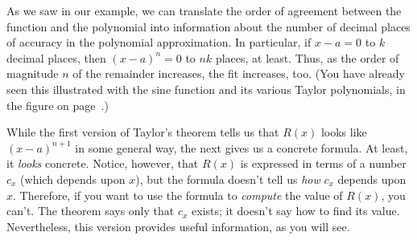 {{{{
 
        As we saw in our example, we can translate the order  
of agreement between the function and the polynomial into information about the number of decimal places of accuracy in the polynomial approximation.  In particular, if $x - a = 0$ to $k$ decimal places, then $(x - a)^n = 0$ to $nk$ places, at least.  Thus, as the order of magnitude $n$ of the remainder increases, the fit increases, too.  (You have already seen this illustrated with the sine function and its various Taylor polynomials, in the figure on page~\pageref{sin3}.)

%
%

\newpage

        While the first version of Taylor's theorem tells us that $R(x)$ 
looks like $(x - a)^{n+1}$ in some general way, the next gives us a concrete formula.  At least, it {\em looks\/} concrete.  Notice, however, that $R(x)$ is expressed in terms of a number $c_x$ (which depends upon $x$), but the formula doesn't tell us {\em how\/} $c_x$ depends upon $x$.  Therefore, if you want to use the formula to {\em compute\/} the value of $R(x)$, you can't.  The theorem says only that $c_x$ exists; it doesn't say how to find its value.  Nevertheless, this version provides useful information, as you will see.
\begin{center}
\end{center}

}}}}
